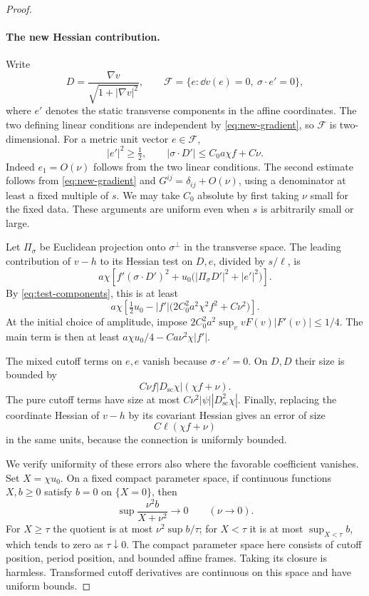 \begin{proof}
\paragraph{The new Hessian contribution.}
Write
\[
 D=\frac{\nabla v}{\sqrt{1+|\nabla v|^2}},\qquad
 \mathcal F=\{e:\dd v(e)=0,\ \sigma\cdot e'=0\},
\]
where $e'$ denotes the static transverse components in the affine
coordinates.  The two defining linear conditions are independent
by \eqref{eq:new-gradient}, so $\mathcal F$ is two-dimensional.
For a metric unit vector $e\in\mathcal F$,
\begin{equation}\label{eq:test-components}
 |e'|^2\ge\tfrac12,\qquad
 |\sigma\cdot D'|\le C_0a\chi f+C\nu.
\end{equation}
Indeed $e_1=O(\nu)$ follows from the two linear conditions.  The
second estimate follows from \eqref{eq:new-gradient} and
$G^{ij}=\delta_{ij}+O(\nu)$, using a denominator at least a fixed
multiple of $s$.  We may take $C_0$ absolute by first taking $\nu$
small for the fixed data.  These arguments are uniform even when
$s$ is arbitrarily small or large.

Let $\Pi_\sigma$ be Euclidean projection onto $\sigma^\perp$ in
the transverse space.  The leading contribution of $v-h$ to its
Hessian test on $D,e$, divided by $s/\ell$, is
\[
 a\chi\left[
 f'(\sigma\cdot D')^2+
 u_0\bigl(|\Pi_\sigma D'|^2+|e'|^2\bigr)\right].
\]
By \eqref{eq:test-components}, this is at least
\[
 a\chi\left[
 \tfrac12u_0-|f'|\bigl(2C_0^2a^2\chi^2 f^2+C\nu^2\bigr)
 \right].
\]
At the initial choice of amplitude, impose
$2C_0^2a^2\sup_v vF(v)|F'(v)|\le1/4$.
The main term is then at least
$a\chi u_0/4-Ca\nu^2\chi|f'|$.

The mixed cutoff terms on $e,e$ vanish because
$\sigma\cdot e'=0$.  On $D,D$ their size is bounded by
\[
 C\nu f|D_{\mathrm{sc}}\chi|(\chi f+\nu).
\]
The pure cutoff terms have size at most
$C\nu^2|\psi||D_{\mathrm{sc}}^2\chi|$.
Finally, replacing the coordinate Hessian of $v-h$ by its covariant
Hessian gives an error of size
\[
 C\ell(\chi f+\nu)
\]
in the same units, because the connection is uniformly bounded.

We verify uniformity of these errors also where the favorable
coefficient vanishes.  Set $X=\chi u_0$.  On a fixed compact
parameter space, if continuous functions $X,b\ge0$ satisfy
$b=0$ on $\{X=0\}$, then
\begin{equation}\label{eq:vanishing-coefficient}
 \sup\frac{\nu^2b}{X+\nu^2}\longrightarrow0
 \qquad(\nu\longrightarrow0).
\end{equation}
For $X\ge\tau$ the quotient is at most
$\nu^2\sup b/\tau$; for $X<\tau$ it is at most
$\sup_{X<\tau}b$, which tends to zero as $\tau\downarrow0$.
The compact parameter space here consists of cutoff position,
period position, and bounded affine frames.  Taking its closure is
harmless.  Transformed cutoff derivatives are continuous on this
space and have uniform bounds.


\end{proof}
